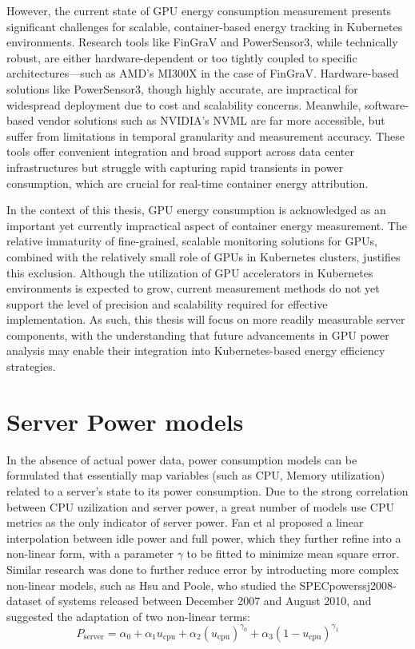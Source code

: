 However, the current state of GPU energy consumption measurement presents significant challenges for scalable, container-based energy tracking in Kubernetes environments. Research tools like FinGraV and PowerSensor3, while technically robust, are either hardware-dependent or too tightly coupled to specific architectures—such as AMD's MI300X in the case of FinGraV. Hardware-based solutions like PowerSensor3, though highly accurate, are impractical for widespread deployment due to cost and scalability concerns. Meanwhile, software-based vendor solutions such as NVIDIA's NVML are far more accessible, but suffer from limitations in temporal granularity and measurement accuracy. These tools offer convenient integration and broad support across data center infrastructures but struggle with capturing rapid transients in power consumption, which are crucial for real-time container energy attribution. 

In the context of this thesis, GPU energy consumption is acknowledged as an important yet currently impractical aspect of container energy measurement. The relative immaturity of fine-grained, scalable monitoring solutions for GPUs, combined with the relatively small role of GPUs in Kubernetes clusters, justifies this exclusion. Although the utilization of GPU accelerators in Kubernetes environments is expected to grow, current measurement methods do not yet support the level of precision and scalability required for effective implementation. As such, this thesis will focus on more readily measurable server components, with the understanding that future advancements in GPU power analysis may enable their integration into Kubernetes-based energy efficiency strategies.





\section{Server Power models}
In the absence of actual power data, power consumption models can be formulated that essentially map variables (such as CPU, Memory utilization) related to a server's state to its power consumption. 
Due to the strong correlation between CPU uzilization and server power, a great number of models use CPU metrics as the only indicator of server power. Fan et al\parencite{fan2007power} proposed a linear interpolation between idle power and full power, which they further refine into a non-linear form, with a parameter $\gamma$ to be fitted to minimize mean square error. Similar research was done to further reduce error by introducting more complex non-linear models, such as Hsu and Poole\parencite{hsu2011power}, who studied the SPECpower\textunderscore ssj2008-dataset of systems released between December 2007 and August 2010, and suggested the adaptation of two non-linear terms:
\begin{equation}
    P_{\text{server}} = \alpha_0 + \alpha_1 u_{\text{cpu}} + \alpha_2 \left( u_{\text{cpu}} \right)^{\gamma_0} + \alpha_3 \left( 1 - u_{\text{cpu}} \right)^{\gamma_1}
\end{equation}

